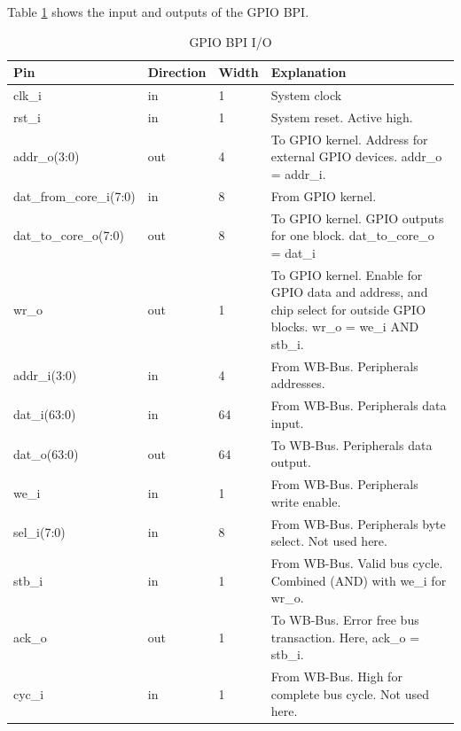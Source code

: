 
Table \ref{tab:asGpioPer05} shows the input and outputs of the GPIO BPI.
\begin{table}[H]
\caption{GPIO BPI I/O}
\label{tab:asGpioPer05}
\centering
\begin{tabularx}{\textwidth}{|l |l |l |X|}
  \hline
  Pin & Direction & Width & Explanation \\
  \hline
  \hline
  clk\_i & in & 1 & System clock \\
  \hline
  rst\_i & in & 1 & System reset. Active high. \\
  \hline
  addr\_o(3:0) & out & 4 & To GPIO kernel. Address for external GPIO devices. addr\_o = addr\_i. \\
  \hline
  dat\_from\_core\_i(7:0) & in & 8 &  From GPIO kernel. \\
  \hline
  dat\_to\_core\_o(7:0) & out & 8 &  To GPIO kernel. GPIO outputs for one block. dat\_to\_core\_o = dat\_i \\
  \hline
  wr\_o & out & 1 &  To GPIO kernel. Enable for GPIO data and address, and chip select for outside GPIO blocks. wr\_o = we\_i AND stb\_i. \\
  \hline
  addr\_i(3:0) & in & 4 &  From WB-Bus. Peripherals addresses. \\
  \hline
  dat\_i(63:0) & in & 64 &  From WB-Bus. Peripherals data input. \\
  \hline
  dat\_o(63:0) & out & 64 &  To WB-Bus. Peripherals data output. \\
  \hline
  we\_i & in & 1 &  From WB-Bus. Peripherals write enable. \\
  \hline
  sel\_i(7:0) & in & 8 &  From WB-Bus. Peripherals byte select. Not used here. \\
  \hline
  stb\_i & in & 1 &  From WB-Bus. Valid bus cycle. Combined (AND) with we\_i for wr\_o.  \\
  \hline
  ack\_o & out & 1 &  To WB-Bus. Error free bus transaction. Here, ack\_o = stb\_i.  \\
  \hline
  cyc\_i & in & 1 &  From WB-Bus. High for complete bus cycle. Not used here.  \\
  \hline
\end{tabularx}
\end{table}
